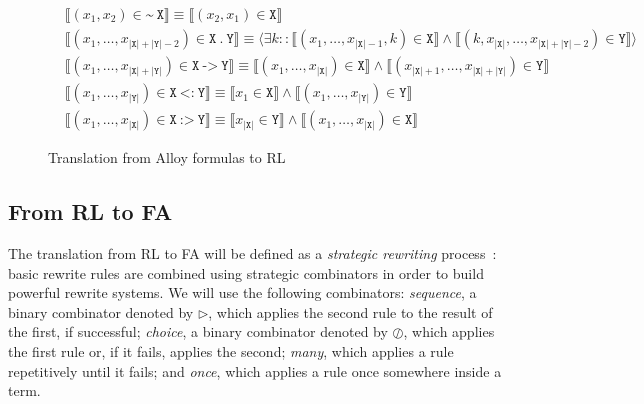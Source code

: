 \documentclass{llncs}
\begin{document}
\begin{figure}[t]
\begin{align*}
&\llbracket (x_1,x_2) \in \mathtt{\texttt{\textasciitilde}\ X} \rrbracket \equiv \llbracket (x_2,x_1) \in \mathtt{X} \rrbracket   \\
&\llbracket (x_1,\dots,x_{|\mathtt{X}|+|\mathtt{Y}|-2}) \in \mathtt{X\ \texttt{.}\ Y} \rrbracket \equiv \langle \exists k :: \llbracket (x_1,\dots,x_{|\mathtt{X}|-1},k) \in \mathtt{X} \rrbracket \wedge \llbracket (k,x_{|\mathtt{X}|},\dots,x_{|\mathtt{X}|+|\mathtt{Y}|-2}) \in \mathtt{Y} \rrbracket \rangle  \\
&\llbracket (x_1,\dots,x_{|\mathtt{X}|+|\mathtt{Y}|}) \in \mathtt{X\ \texttt{->}\ Y} \rrbracket \equiv   \llbracket (x_1,\dots,x_{|\mathtt{X}|}) \in \mathtt{X} \rrbracket \wedge \llbracket (x_{|\mathtt{X}| + 1},\dots,x_{|\mathtt{X}|+|\mathtt{Y}|})  \in \mathtt{Y} \rrbracket  \\ 
&\llbracket (x_1,\dots,x_{|\mathtt{Y}|}) \in \mathtt{X\ \texttt{<:}\ Y} \rrbracket \equiv \llbracket x_1 \in \mathtt{X} \rrbracket \wedge \llbracket (x_1,\dots,x_{|\mathtt{Y}|}) \in \mathtt{Y} \rrbracket  \\
&\llbracket (x_1,\dots,x_{|\mathtt{X}|}) \in \mathtt{X\ \texttt{:>}\ Y} \rrbracket \equiv \llbracket x_{|\mathtt{X}|} \in \mathtt{Y} \rrbracket \wedge \llbracket (x_1,\dots,x_{|\mathtt{X}|}) \in \mathtt{X} \rrbracket  
\end{align*}  
  \caption{Translation from Alloy formulas to RL}
  \label{fig:alloy2rl}
\end{figure}

\subsection{From RL to FA}
\label{sec:trpwpf}

The translation from RL to FA will be defined as a \emph{strategic
  rewriting} process~\cite{sw}: basic rewrite rules are combined using
strategic combinators in order to build powerful rewrite systems. We
will use the following combinators: \emph{sequence}, a binary
combinator denoted by $\triangleright$, which applies the second rule
to the result of the first, if successful; \emph{choice}, a binary
combinator denoted by $\oslash$, which applies the first rule or, if it
fails, applies the second; \emph{many}, which applies a rule
repetitively until it fails; and \emph{once}, which applies a rule once
somewhere inside a term.
\end{document}
